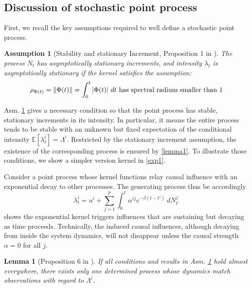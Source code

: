 \documentclass[10pt]{article}
\numberwithin{figure}{section}
\newtheorem{assumption}{Assumption}
\newtheorem{lemma}{Lemma}
\begin{document}
\subsection{Discussion of stochastic point process}

First, we recall the key assumptions required to well define a stochastic point process.

\begin{assumption}[Stability and stationary Increment, Proposition 1 in \citep{bacry_hawkes_2015}]\label{asmp: 1}
    The process $N_t$ has asymptotically stationary increments, and intensity $\lambda_t$ is asymptotically stationary if the kernel satisfies the assumption:
\begin{align}
    \rho_{\Phi(t)}=\|\Phi(t)\|=\int_{0}^{t}|\Phi(t)|\ dt ~ \textnormal{has spectral radium smaller than 1}
\end{align}
\end{assumption}
Asm. \ref{asmp: 1} gives a necessary condition so that the point process has stable, stationary increments in its intensity.  In particular, it means the entire process tends to be stable with an unknown but fixed expectation of the conditional intensity $\mathbb{E}[\lambda_t^i]=\Lambda^i$. Restricted by the stationary increment assumption, the existence of the corresponding process is ensured by \autoref{lemma1}. To illustrate those conditions, we show a simpler version kernel in \autoref{exp1}. 

\begin{aexample}\label{exp1}
    Consider a point process whose kernel functions relay causal influence with an exponential decay to other processes. The generating process thus be accordingly
    \begin{equation*}
        \lambda_t^i = u^i +\sum\limits_{j=1}^{p}\int_{0}^{t}\alpha ^{ij}e^{-\beta (t-t')}\ dN_{t'}^j
    \end{equation*}
shows the exponential kernel triggers influences that are sustaining but decaying as time proceeds. Technically, the induced causal influences, although decaying from inside the system dynamics, will not disappear unless the causal strength $\alpha=0$ for all $j$. 
\end{aexample}

\begin{lemma}[Proposition 6 in \cite{kirchner_hawkes_2016}]\label{lemma1}
If all conditions and results in Asm.  \ref{asmp: 1} hold almost everywhere, there exists only one determined process whose dynamics match observations with regard to $\Lambda^i$.
\end{lemma}
\end{document}
